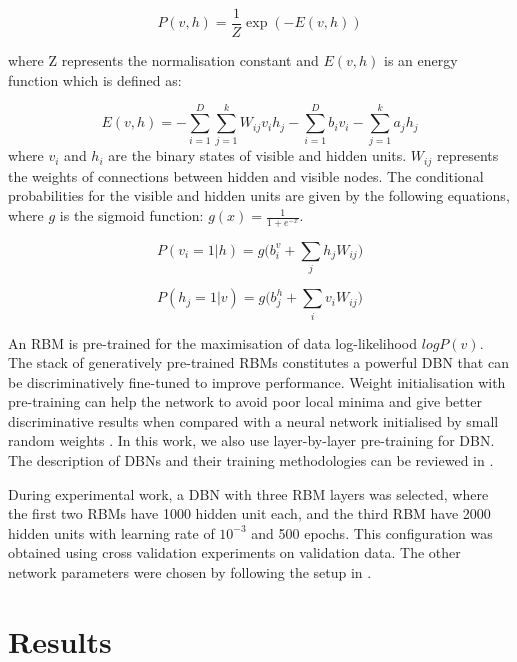 \documentclass[a4paper]{article}
\newcommand*{\JE}[1]{\textcolor{magenta}{#1}}
\begin{document}
\begin{equation}
    P(v,h)= \frac{1}{Z}\exp({-E(v,h)})
\end{equation}

where Z represents the normalisation constant and $E(v, h)$ is an energy
function which is defined as:

\begin{equation}
    E(v,h)=  -\sum_{i=1}^{D}\sum_{j=1}^{k}W_{ij}v_{i}h_{j}-\sum_{i=1}^{D}b_{i}v_{i}-\sum_{j=1}^{k}a_{j}h_{j}
\end{equation}
where $v_{i}$ and $h_{i}$ are the binary states of visible and hidden units. $W_{ij}$ represents the weights of connections between hidden and visible nodes. The conditional probabilities for the visible and hidden units are given by the following equations, where $g$ is the sigmoid function: $g(x)= \frac{1}{1+e^{-x}}$.

\begin{equation}
    P(v_{i}=1|h)= g\big(b_{i}^{v}+ \sum_{j}h_{j}W_{ij}\big)
\end{equation}

\begin{equation}
    P(h_{j}=1|v)= g\big(b_{j}^{h}+ \sum_{i}v_{i}W_{ij}\big)
\end{equation}




An RBM is pre-trained for the maximisation of data log-likelihood $log P (v)$. The stack of generatively pre-trained RBMs constitutes a powerful DBN that can be discriminatively fine-tuned to improve performance. Weight initialisation with pre-training can help the network to avoid poor local minima and give better discriminative results when compared with a neural network initialised by small random weights \cite{erhan2010does}. In this work, we also use layer-by-layer pre-training for DBN. The description of DBNs and their training methodologies can be reviewed in \cite{hinton2002training,hinton2006fast}.

During experimental work, a DBN with three RBM layers was selected, where the first two RBMs have 1000 hidden unit each, and the third RBM have 2000 hidden units with learning rate of $10^{-3}$ and 500 epochs. This configuration was obtained using cross validation experiments on  validation data. %
The other network parameters were chosen by following the setup in \cite{rana2016emotion,keyvanrad2014brief}. 


\section{Results}
\label{sec:experimentation}
\end{document}
